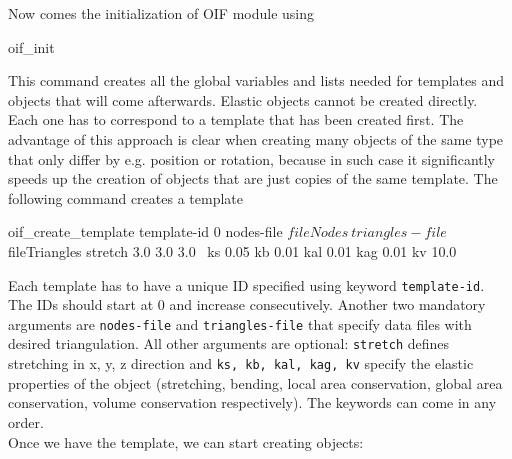 \documentclass[
a4paper,                        %
11pt,                           %
twoside,                        %
footsepline,                    %
headsepline,                    %
headexclude,                    %
footexclude,                    %
pagesize,                       %
]{scrartcl}
\begin{document}
Now comes the initialization of OIF module using\\ 
\begin{tclcode}
  oif_init
\end{tclcode}
\vspace{0 mm}

This command creates all the global variables and lists needed for templates and objects that will come afterwards. Elastic objects cannot be created directly. Each one has to correspond to a template that has been created first. The advantage of this approach is clear when creating many objects of the same type that only differ by e.g. position or rotation, because in such case it significantly speeds up the creation of objects that are just copies of the same template. The following command creates a template\\
\begin{tclcode}
  oif_create_template template-id 0 nodes-file $fileNodes \ 
  triangles-file $fileTriangles stretch 3.0 3.0 3.0 \
  ks 0.05 kb 0.01 kal 0.01 kag 0.01 kv 10.0
\end{tclcode}
\vspace{0 mm}

Each template has to have a unique ID specified using keyword \verb|template-id|. The IDs should start at 0 and increase consecutively. Another two mandatory arguments are \verb|nodes-file| and \verb|triangles-file| that specify data files with desired triangulation. All other arguments are optional: \verb|stretch| defines stretching in x, y, z direction and \verb|ks, kb, kal, kag, kv| specify the elastic properties of the object (stretching, bending, local area conservation, global area conservation, volume conservation respectively). The keywords can come in any order.\\

Once we have the template, we can start creating objects:\\
\vspace{0 mm}
\end{document}
